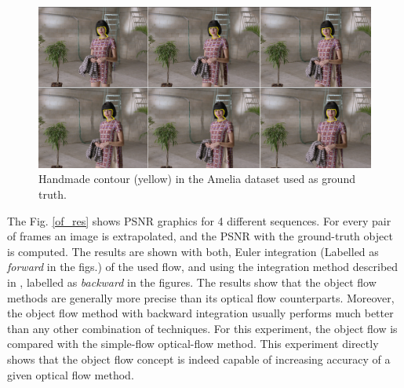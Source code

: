    \begin{figure}[thpb]
      \centering
      \includegraphics[width=1.0\textwidth]{../images/handmade_contour.png}
      \caption{Handmade contour (yellow) in the Amelia dataset used as ground truth.}
      \label{handmade}
   \end{figure}

The Fig. \ref{of_res} shows PSNR graphics for 4 different sequences. For every pair of frames an image is extrapolated, and the PSNR with the ground-truth object is computed.
The results are shown with both, Euler integration (Labelled as {\it forward} in the figs.) of the used flow, 
and using the integration method described in \cite{c20}, labelled as {\it backward} in the figures. The results show that the object flow methods are generally more precise than its optical flow 
counterparts. Moreover, the object flow method with backward integration usually performs much better than any other combination of techniques. For this experiment, the object flow is compared with the simple-flow optical-flow method. This experiment directly shows that the object flow concept is indeed capable of increasing accuracy of a given optical flow method. 

